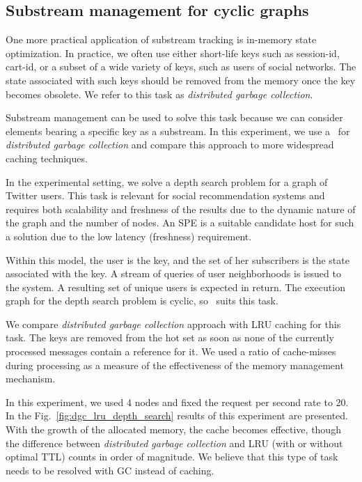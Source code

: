 \subsection{Substream management for cyclic graphs}

One more practical application of substream tracking is in-memory state optimization. In practice, we often use either short-life keys such as session-id, cart-id, or a subset of a wide variety of keys, such as users of social networks. The state associated with such keys should be removed from the memory once the key becomes obsolete. We refer to this task as \textit{distributed garbage collection}.

Substream management can be used to solve this task because we can consider elements bearing a specific key as a substream. In this experiment, we use a \tracker\ for \textit{distributed garbage collection} and compare this approach to more widespread caching techniques.

In the experimental setting, we solve a depth search problem for a graph of Twitter users. This task is relevant for social recommendation systems and requires both scalability and freshness of the results due to the dynamic nature of the graph and the number of nodes. An SPE is a suitable candidate host for such a solution due to the low latency (freshness) requirement. 

Within this model, the user is the key, and the set of her subscribers is the state associated with the key. A stream of queries of user neighborhoods is issued to the system. A resulting set of unique users is expected in return. The execution graph for the depth search problem is cyclic, so \tracker\ suits this task. 

We compare \textit{distributed garbage collection} approach with LRU caching for this task. The keys are removed from the hot set as soon as none of the currently processed messages contain a reference for it. We used a ratio of cache-misses during processing as a measure of the effectiveness of the memory management mechanism. 

In this experiment, we used 4 nodes and fixed the request per second rate to 20. In the Fig.~\ref{fig:dgc_lru_depth_search} results of this experiment are presented. With the growth of the allocated memory, the cache becomes effective, though the difference between 
\textit{distributed garbage collection} and LRU (with or without optimal TTL) counts in order of magnitude. We believe that this type of task needs to be resolved with GC instead of caching.

